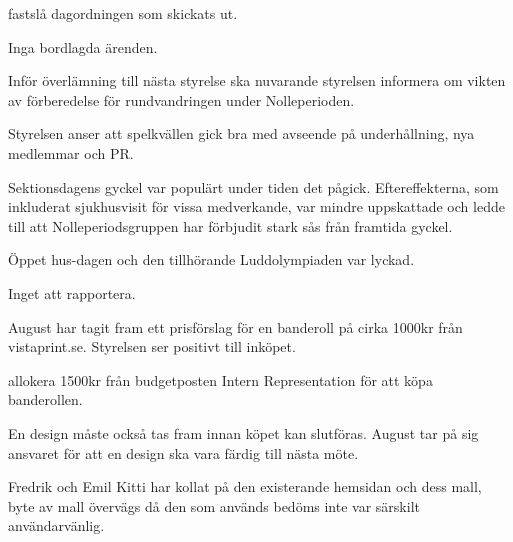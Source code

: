 \documentclass{protokoll}
\begin{document}
\newpage  


\begin{beslut}
     \att fastslå dagordningen som skickats ut.
\end{beslut}

Inga bordlagda ärenden.

Inför överlämning till nästa styrelse ska nuvarande styrelsen informera om vikten av förberedelse för rundvandringen under Nolleperioden. 

Styrelsen anser att spelkvällen gick bra med avseende på underhållning, nya medlemmar och PR.

Sektionsdagens gyckel var populärt under tiden det pågick. Eftereffekterna, som inkluderat sjukhusvisit för vissa medverkande, var mindre uppskattade och ledde till att Nolleperiodsgruppen har förbjudit stark sås från framtida gyckel. 

Öppet hus-dagen och den tillhörande Luddolympiaden var lyckad. 


Inget att rapportera.

August har tagit fram ett prisförslag för en banderoll på cirka 1000kr från vistaprint.se. Styrelsen ser positivt till inköpet.
\begin{beslut}
    \att allokera 1500kr från budgetposten Intern Representation för att köpa banderollen.
\end{beslut}
En design måste också tas fram innan köpet kan slutföras. August tar på sig ansvaret för att en design ska vara färdig till nästa möte.

Fredrik och Emil Kitti har kollat på den existerande hemsidan och dess mall, byte av mall övervägs då den som används bedöms inte var särskilt användarvänlig.
\end{document}
